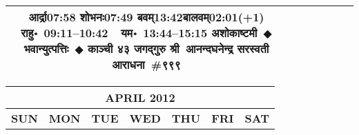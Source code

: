 \documentclass[a3paper,12pt,landscape]{article}
\newcommand{\eventsep}{~$\Diamondblack$ }
\newcommand{\To}{\hspace{1pt}\raisebox{0pt}{\tiny\RIGHTarrow}\hspace{1pt}}
\newcommand{\rahuyama}[2]{%
{राहु॰~\textsf{#1}~~यम॰~\textsf{#2}}
}
\begin{document}
\begin{center}
\begin{tabular}{|c|c|c|c|c|c|c|}
{{\mbox{आर्द्रा\To{}\textsf{07:58\hspace{2ex}}}}%
{\mbox{शोभनः\To{}\textsf{07:49\hspace{2ex}}}}%
{\mbox{बवम्\To{}\textsf{13:42\hspace{2ex}}}\mbox{बालवम्\To{}\textsf{02:01(+1)\hspace{2ex}}}}}%
{\rahuyama{09:11--10:42}{13:44--15:15}}%
{अशोकाष्टमी\eventsep भवान्युत्पत्तिः\eventsep काञ्ची ४३ जगद्गुरु श्री~आनन्दघनेन्द्र सरस्वती आराधना~\#{९९९}}
\\ \hline %
\end{tabular}



\begin{tabular}{|c|c|c|c|c|c|c|}
\multicolumn{7}{c}{\Large \bfseries \sffamily APRIL 2012}\\[3mm]
\hline
\textbf{\textsf{SUN}} & \textbf{\textsf{MON}} & \textbf{\textsf{TUE}} & \textbf{\textsf{WED}} & \textbf{\textsf{THU}} & \textbf{\textsf{FRI}} & \textbf{\textsf{SAT}} \\ \hline


\end{tabular}
\end{center}
\end{document}
